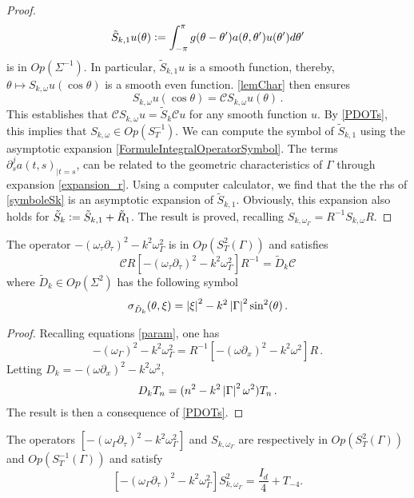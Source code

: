 \documentclass[a4paper]{article}
\begin{document}
\begin{proof}
	\[\tilde{S}_{k,1} u(\theta) \mathrel{\mathop:}= \int_{-\pi}^\pi g(\theta-\theta') a(\theta,\theta')u(\theta')d\theta'\]
	is in $\textit{Op}(\Sigma^{-1})$. In particular, $\tilde{S}_{k,1}u$ is a smooth function, thereby, $\theta \mapsto S_{k,\omega}u(\cos\theta)$ is a smooth even function. \autoref{lemChar} then ensures 
	\[S_{k,\omega}u(\cos\theta) = \mathcal{C} S_{k,\omega}u(\theta)\,.\] 
	This establishes that $\mathcal{C} S_{k,\omega}u = \tilde{S}_k \mathcal{C}u$ for any smooth function $u$. By \autoref{PDOTs}, this implies that $S_{k,\omega} \in \textit{Op}\left(S_T^{-1}\right)$. We can compute the symbol of $\tilde{S}_{k,1}$ using the asymptotic expansion \eqref{FormuleIntegralOperatorSymbol}. The terms $\partial_s^ja(t,s)_{|t=s}$, can be related to the geometric characteristics of $\Gamma$ through expansion \eqref{expansion_r}. Using a computer calculator, we find that the the rhs of \eqref{symboleSk} is an asymptotic expansion of $\tilde{S}_{k,1}$. Obviously, this expansion also holds for $\tilde{S}_k \mathrel{\mathop:}= \tilde{S}_{k,1} + \tilde{R}_1$. The result is proved, recalling $S_{k,\omega_\Gamma} = R^{-1}S_{k,\omega}R$.
\end{proof}
\begin{Lem}
	\label{LemsymbolDk}
	The operator $-(\omega_\tau \partial_\tau)^2 - k^2 \omega_\Gamma^2$ is in $\textit{Op}(S_{T}^2(\Gamma))$ and satisfies 
	\[\mathcal{C}R\left[-(\omega_\tau \partial_\tau)^2 - k^2 \omega_\Gamma^2\right]R^{-1} = \tilde{D}_k\mathcal{C}\] 
	where $\tilde{D}_k \in \textit{Op}(\Sigma^2)$ has the following symbol
	\begin{equation}
		\sigma_{\tilde{D}_k}(\theta,\xi) = \left\lvert \xi \right\rvert^2 - k^2 \left\lvert \Gamma \right\rvert^2 \sin^2(\theta)\,.
		\label{symbolDk}
	\end{equation}
\end{Lem}
\begin{proof}
	Recalling equations \eqref{param}, one has 
	\[-(\omega_\Gamma)^2 - k^2 \omega_\Gamma^2 = R^{-1} \left[-(\omega \partial_x)^2 - k^2 \omega^2\right]R\,.\]
	Letting $D_k = -(\omega \partial_x)^2 - k^2 \omega^2$,
	\[D_k T_n = (n^2 - k^2\left\lvert \Gamma \right\rvert^2\omega^2)T_n\,.\]
	The result is then a consequence of \autoref{PDOTs}.
\end{proof}
\begin{The}
	\label{TheSkomega}
	The operators $\left[-(\omega_\Gamma \partial_\tau)^2 - k^2\omega_\Gamma^2\right]$ and  $S_{k,\omega_\Gamma}$ are respectively in $\textit{Op}(S^{2}_T(\Gamma))$ and $\textit{Op}(S^{-1}_T(\Gamma))$ and satisfy
	\[\left[-(\omega_\Gamma \partial_\tau)^2 - k^2\omega_\Gamma^2\right] S_{k,\omega_\Gamma}^2 = \frac{I_d}{4} + T_{-4}.\]
\end{The}
\end{document}
